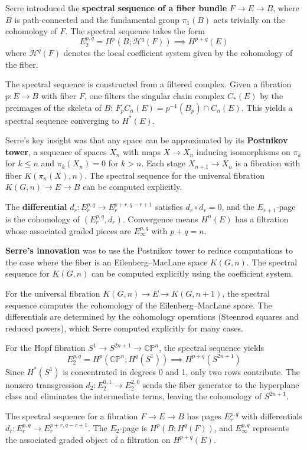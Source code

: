Serre introduced the \textbf{spectral sequence of a fiber bundle} $F \to E \to B$, where $B$ is path-connected and the fundamental group $\pi_1(B)$ acts trivially on the cohomology of $F$. The spectral sequence takes the form
\[E_2^{p,q} = H^p(B; \mathcal{H}^q(F)) \implies H^{p+q}(E)\]
where $\mathcal{H}^q(F)$ denotes the local coefficient system given by the cohomology of the fiber.

The spectral sequence is constructed from a filtered complex. Given a fibration $p: E \to B$ with fiber $F$, one filters the singular chain complex $C_*(E)$ by the preimages of the skeleta of $B$: $F_p C_n(E) = p^{-1}(B_p) \cap C_n(E)$. This yields a spectral sequence converging to $H^*(E)$.

Serre's key insight was that any space can be approximated by its \textbf{Postnikov tower}, a sequence of spaces $X_n$ with maps $X \to X_n$ inducing isomorphisms on $\pi_k$ for $k \leq n$ and $\pi_k(X_n) = 0$ for $k > n$. Each stage $X_{n+1} \to X_n$ is a fibration with fiber $K(\pi_n(X), n)$. The spectral sequence for the universal fibration $K(G, n) \to E \to B$ can be computed explicitly.

The \textbf{differential} $d_r: E_r^{p,q} \to E_r^{p+r, q-r+1}$ satisfies $d_r \circ d_r = 0$, and the $E_{r+1}$-page is the cohomology of $(E_r^{p,q}, d_r)$. Convergence means $H^n(E)$ has a filtration whose associated graded pieces are $E_\infty^{p,q}$ with $p+q = n$.

\textbf{Serre's innovation} was to use the Postnikov tower to reduce computations to the case where the fiber is an Eilenberg--MacLane space $K(G, n)$. The spectral sequence for $K(G, n)$ can be computed explicitly using the coefficient system.

For the universal fibration $K(G, n) \to E \to K(G, n+1)$, the spectral sequence computes the cohomology of the Eilenberg--MacLane space. The differentials are determined by the cohomology operations (Steenrod squares and reduced powers), which Serre computed explicitly for many cases.

For the Hopf fibration $S^1 \to S^{2n+1} \to \mathbb{CP}^n$, the spectral sequence yields
\[E_2^{p,q} = H^p(\mathbb{CP}^n; H^q(S^1)) \implies H^{p+q}(S^{2n+1})\]
Since $H^*(S^1)$ is concentrated in degrees 0 and 1, only two rows contribute. The nonzero transgression $d_2:E_2^{0,1}\to E_2^{2,0}$ sends the fiber generator to the hyperplane class and eliminates the intermediate terms, leaving the cohomology of $S^{2n+1}$.

The spectral sequence for a fibration $F \to E \to B$ has pages $E_r^{p,q}$ with differentials $d_r: E_r^{p,q} \to E_r^{p+r, q-r+1}$. The $E_2$-page is $H^p(B; H^q(F))$, and $E_\infty^{p,q}$ represents the associated graded object of a filtration on $H^{p+q}(E)$.

